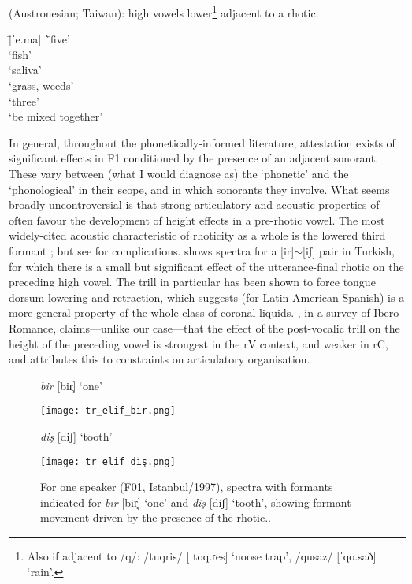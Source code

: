 \clearpage
\begin{example} \label{tr:thao}
   (Austronesian; Taiwan): high vowels lower\footnote{Also if adjacent to /q/: /tuqris/ [ˈtoq.ɾes] `noose trap', /qusaz/ [ˈqo.sað] `rain'.} adjacent to a rhotic. \citep{Blust2013}
  \begin{tabbing}
   \tab[2cm] \= [ˈe.ma] \tab[2cm] \= `five'\\
    \> `fish'\\
   \> [ˈi.\ipa{ɾ}oʃ] \> `saliva'\\
   \> [ɬmeɾ] \> `grass, weeds' \\
   \> [ˈto.ɾo] \> `three' \\
    \> `be mixed together'
    \end{tabbing}
\end{example}

In general, throughout the phonetically-informed literature, attestation exists of significant effects in F1 conditioned by the presence of an adjacent sonorant. These vary between (what I would diagnose as) the `phonetic' and the `phonological' in their scope, and in which sonorants they involve. What seems broadly uncontroversial is that strong articulatory and acoustic properties of  often favour the development of height effects in a pre-rhotic vowel. The most widely-cited acoustic characteristic of rhoticity as a whole is the lowered third formant \citep{Ladefoged2003}; but see \citet{Lindau1985} for complications.  shows spectra for a [ir]$\sim$[iʃ] pair in Turkish, for which there is a small but significant effect of the utterance-final rhotic on the preceding high vowel. The trill in particular \citep{Recasens1991,Recasens1999,Sole2002} has been shown to force tongue dorsum lowering and retraction, which \citet{Proctor2009} suggests (for Latin American Spanish) is a more general property of the whole class of coronal liquids. \citet{Bradley2010}, in a survey of Ibero-Romance, claims---unlike our case---that the effect of the post-vocalic trill on the height of the preceding vowel is strongest in the \textunderscore rV context, and weaker in \textunderscore rC, and attributes this to constraints on articulatory organisation.

\begin{figure}[h]
  \centering

  { \textit{bir} [bir̥] `one' }

  \texttt{[image: tr\_elif\_bir.png]}\\
  \vspace{12pt}

  \textit{diş} [diʃ] `tooth'

  \texttt{[image: tr\_elif\_diş.png]}
  \caption[Spectrum for \textit{bir} `one' and \textit{diş} `tooth'.]{For one speaker (F01, Istanbul/1997), spectra with formants indicated for \emph{bir} [bir̥] `one' and \textit{diş} [diʃ] `tooth', showing formant movement driven by the presence of the rhotic.\footnotemark.}
  \label{fig:tr_rhotic_spectrum}
\end{figure}

